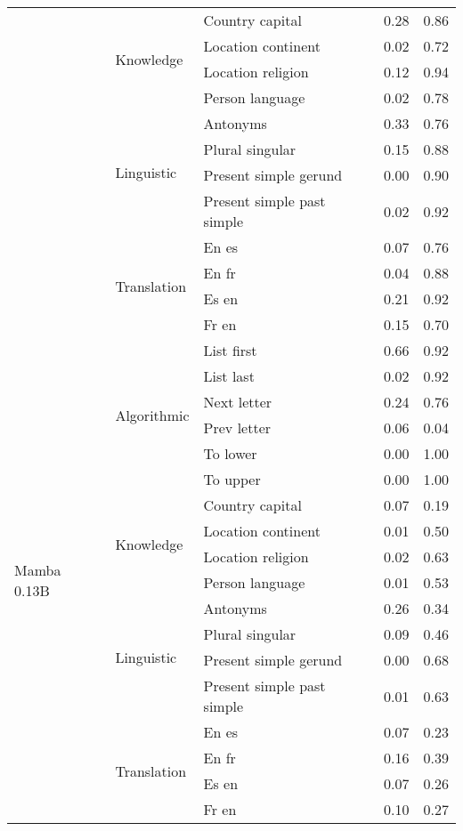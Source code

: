\begin{center}
\begin{longtable}{lllrr}
 & \multirow[t]{4}{*}{Knowledge} & Country capital & 0.28 & 0.86 \\
 &  & Location continent & 0.02 & 0.72 \\
 &  & Location religion & 0.12 & 0.94 \\
 &  & Person language & 0.02 & 0.78 \\
\cline{2-5}
 & \multirow[t]{4}{*}{Linguistic} & Antonyms & 0.33 & 0.76 \\
 &  & Plural singular & 0.15 & 0.88 \\
 &  & Present simple gerund & 0.00 & 0.90 \\
 &  & Present simple past simple & 0.02 & 0.92 \\
\cline{2-5}
 & \multirow[t]{4}{*}{Translation} & En es & 0.07 & 0.76 \\
 &  & En fr & 0.04 & 0.88 \\
 &  & Es en & 0.21 & 0.92 \\
 &  & Fr en & 0.15 & 0.70 \\
\cline{1-5} \cline{2-5}
\multirow[t]{18}{*}{Mamba 0.13B} & \multirow[t]{6}{*}{Algorithmic} & List first & 0.66 & 0.92 \\
 &  & List last & 0.02 & 0.92 \\
 &  & Next letter & 0.24 & 0.76 \\
 &  & Prev letter & 0.06 & 0.04 \\
 &  & To lower & 0.00 & 1.00 \\
 &  & To upper & 0.00 & 1.00 \\
\cline{2-5}
 & \multirow[t]{4}{*}{Knowledge} & Country capital & 0.07 & 0.19 \\
 &  & Location continent & 0.01 & 0.50 \\
 &  & Location religion & 0.02 & 0.63 \\
 &  & Person language & 0.01 & 0.53 \\
\cline{2-5}
 & \multirow[t]{4}{*}{Linguistic} & Antonyms & 0.26 & 0.34 \\
 &  & Plural singular & 0.09 & 0.46 \\
 &  & Present simple gerund & 0.00 & 0.68 \\
 &  & Present simple past simple & 0.01 & 0.63 \\
\cline{2-5}
 & \multirow[t]{4}{*}{Translation} & En es & 0.07 & 0.23 \\
 &  & En fr & 0.16 & 0.39 \\
 &  & Es en & 0.07 & 0.26 \\
 &  & Fr en & 0.10 & 0.27 \\

\end{longtable}
\end{center}
